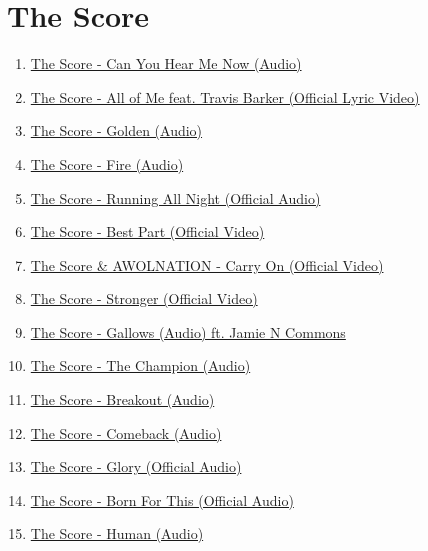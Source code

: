 \documentclass{book}
\numberwithin{equation}{section}
\begin{document}

\chapter{The Score}
\begin{enumerate}
    \item \href{https://www.youtube.com/watch?v=8RDy31N0gdY}{The Score - Can You Hear Me Now (Audio)}
    \item \href{https://www.youtube.com/watch?v=WHowaIzJYKw}{The Score - All of Me feat. Travis Barker (Official Lyric Video)}
    \item \href{https://www.youtube.com/watch?v=4qgYWWRpnD8}{The Score - Golden (Audio)}
    \item \href{https://www.youtube.com/watch?v=F4dctjz3tUk}{The Score - Fire (Audio)}
    \item \href{https://www.youtube.com/watch?v=A6yjM0iZ3-A}{The Score - Running All Night (Official Audio)}
    \item \href{https://www.youtube.com/watch?v=cWeLYV1fkAs}{The Score - Best Part (Official Video)}
    \item \href{https://www.youtube.com/watch?v=aoIK6Rr71TE}{The Score \& AWOLNATION - Carry On (Official Video)}
    \item \href{https://www.youtube.com/watch?v=cNld-AHw-Wg}{The Score - Stronger (Official Video)}
    \item \href{https://www.youtube.com/watch?v=3wZllhP3FZo}{The Score - Gallows (Audio) ft. Jamie N Commons}
    \item \href{https://www.youtube.com/watch?v=O5AMl3t817o}{The Score - The Champion (Audio)}
    \item \href{https://www.youtube.com/watch?v=PE75F4ynC_U}{The Score - Breakout (Audio)}
    \item \href{https://www.youtube.com/watch?v=e0AUz9AdxNA}{The Score - Comeback (Audio)}
    \item \href{https://www.youtube.com/watch?v=i3ucSSVJTL4}{The Score - Glory (Official Audio)}
    \item \href{https://www.youtube.com/watch?v=aJ5IzGBnWAc}{The Score - Born For This (Official Audio)}
    \item \href{https://www.youtube.com/watch?v=m7uSvfXrF2A}{The Score - Human (Audio)}
\end{enumerate}
\end{document}
